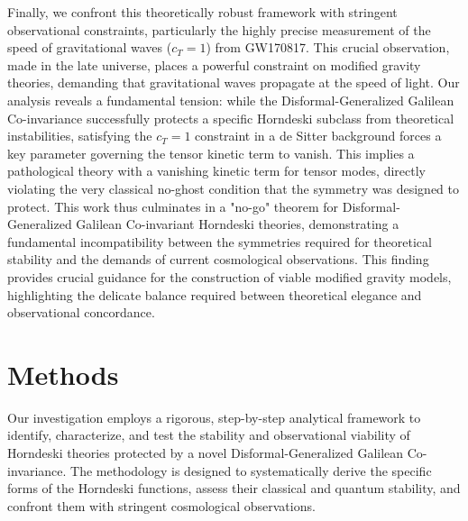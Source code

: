 \documentclass[twocolumn]{aastex631}
\begin{document}
Finally, we confront this theoretically robust framework with stringent observational constraints, particularly the highly precise measurement of the speed of gravitational waves ($c_T=1$) from GW170817. This crucial observation, made in the late universe, places a powerful constraint on modified gravity theories, demanding that gravitational waves propagate at the speed of light. Our analysis reveals a fundamental tension: while the Disformal-Generalized Galilean Co-invariance successfully protects a specific Horndeski subclass from theoretical instabilities, satisfying the $c_T=1$ constraint in a de Sitter background forces a key parameter governing the tensor kinetic term to vanish. This implies a pathological theory with a vanishing kinetic term for tensor modes, directly violating the very classical no-ghost condition that the symmetry was designed to protect. This work thus culminates in a "no-go" theorem for Disformal-Generalized Galilean Co-invariant Horndeski theories, demonstrating a fundamental incompatibility between the symmetries required for theoretical stability and the demands of current cosmological observations. This finding provides crucial guidance for the construction of viable modified gravity models, highlighting the delicate balance required between theoretical elegance and observational concordance.


\section{Methods}
\label{sec:methods}
Our investigation employs a rigorous, step-by-step analytical framework to identify, characterize, and test the stability and observational viability of Horndeski theories protected by a novel Disformal-Generalized Galilean Co-invariance. The methodology is designed to systematically derive the specific forms of the Horndeski functions, assess their classical and quantum stability, and confront them with stringent cosmological observations.
\end{document}

